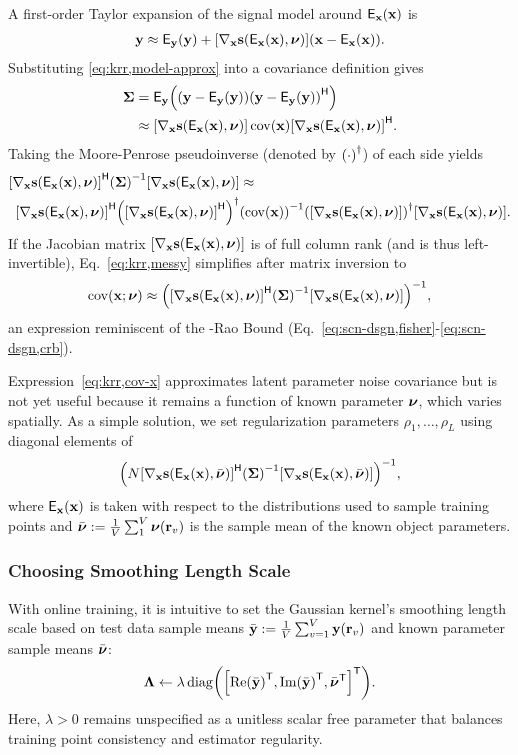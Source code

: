 A first-order Taylor expansion
of the signal model 
around $\expect{\bmx}{\bmx}$ is
\begin{align}
	\bmy \approx \expect{\bmy}{\bmy} + 
		\gradxs \paren{\bmx - \expect{\bmx}{\bmx}}.
	\label{eq:krr,model-approx}
\end{align}
Substituting \eqref{eq:krr,model-approx}
into a covariance definition gives
\begin{align}
	\bmSig &= 
		\expect{\bmy}{
			\paren{\bmy - \expect{\bmy}{\bmy}}
			\paren{\bmy - \expect{\bmy}{\bmy}}\ctpose
		}
		\nonumber \\
		&\approx \gradxs \cov{\bmx} \gradxs\ctpose.
		\label{eq:krr,cov-y}
\end{align}
Taking the Moore-Penrose pseudoinverse 
(denoted by $\pinv{\cdot}$)
of each side yields 
\begin{align}
	\gradxs\ctpose \inv{\bmSig} \gradxs &\approx 
		\label{eq:krr,messy} \\
	\gradxs\ctpose \pinv{\gradxs\ctpose} &\inv{\cov{\bmx}} \pinv{\gradxs} \gradxs.
		\nonumber
\end{align}
If the Jacobian matrix $\gradxs$ 
is of full column rank
(and is thus left-invertible), 
Eq.~\eqref{eq:krr,messy} simplifies
after matrix inversion to
\begin{align}
	\cov{\bmx; \bmnu} \approx \inv{\gradxs\ctpose \inv{\bmSig} \gradxs},
	\label{eq:krr,cov-x}
\end{align}
an expression reminiscent
of the \Cramer-Rao Bound 
(\cf Eq.~\eqref{eq:scn-dsgn,fisher}-\eqref{eq:scn-dsgn,crb}).

Expression~\eqref{eq:krr,cov-x} approximates
latent parameter noise covariance 
but is not yet useful
because it remains a function 
of known parameter $\boldsymbol{\nu}$,
which varies spatially.
As a simple solution,
we set regularization parameters $\rho_1,\dots,\rho_L$
using diagonal elements of
$$\inv{N \gradxvs\ctpose \inv{\bmSig} \gradxvs},$$
where $\expx$ is taken
with respect to 
the distributions 
used to sample training points 
and $\nubar := \frac{1}{V} \sum_1^V \bmnu\paren{\bmr_v}$
is the sample mean 
of the known object parameters.

\subsubsection{Choosing Smoothing Length Scale}
\label{sss,krr,pract,mod,lam}

With online training,
it is intuitive
to set the Gaussian kernel's 
smoothing length scale 
based on test data sample means
$\bar{\bmy} := \frac{1}{V} \sum_{v=1}^V \bmy\paren{\bmr_v}$
and known parameter sample means $\bar{\boldsymbol{\nu}}$:
\begin{align}
	\bmL \gets \lambda 
	\diag{\brac{\re{\bar{\bmy}}\tpose, \im{\bar{\bmy}}\tpose, \nubar\tpose}\tpose}.
	\label{eq:krr,length}
\end{align}
Here, $\lambda>0$ remains unspecified
as a unitless scalar free parameter
that balances training point consistency 
and estimator regularity.

